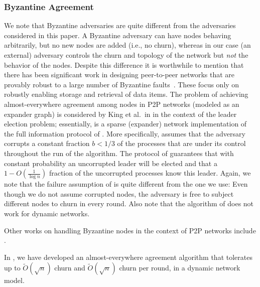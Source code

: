 \documentclass[leqno,11pt]{article}
\begin{document}
\subsubsection{Byzantine Agreement}
We note that Byzantine adversaries are quite different from the adversaries considered in this paper.  A Byzantine
adversary can have nodes behaving arbitrarily, but no new nodes  are added (i.e., no churn),
whereas in our case (an external) adversary  controls the churn and topology of
the network but {\em not} the behavior of the nodes. Despite this difference it is worthwhile to mention that
there has been significant work in designing peer-to-peer networks that
are provably robust to a large number of Byzantine
faults~\cite{FS02,HK03,NW03,Scheideler05}. These focus only on robustly enabling storage and retrieval of data items. 
The problem of achieving almost-everywhere agreement among nodes in P2P networks (modeled as an expander graph) is
considered by King et al.\ in \cite{KSSV06} in the context of the leader
election problem; essentially, \cite{KSSV06} is a sparse (expander) network
implementation of the full information protocol of \cite{KSS06}.  
More specifically, \cite{KSSV06} assumes that the
adversary corrupts a constant fraction $b < 1/3$ of the
processes that are under its control throughout the run of the algorithm.
The protocol of \cite{KSSV06} guarantees that with constant probability an
uncorrupted leader will be elected and that a $1-O(\frac{1}{\log n})$
fraction of the uncorrupted processes know this leader. Again, we note that the
failure assumption of \cite{KSSV06} is quite different from the one we use: Even though we do not assume corrupted nodes, the adversary is free
to subject different nodes to churn in every round. Also note that
the algorithm of \cite{KSSV06} does not work for dynamic networks. 

Other works on handling Byzantine nodes in the context of P2P networks include \cite{Scheideler05,awerbuch:group,fiat:dynamically,fiat:making,awerbuch:random,castro:secure,young:practical}.

In \cite{podc13}, we have developed an almost-everywhere agreement algorithm that tolerates up to $\tilde O(\sqrt{n})$ churn and $\tilde O(\sqrt{n})$ churn per round, in a dynamic network model.
\end{document}
